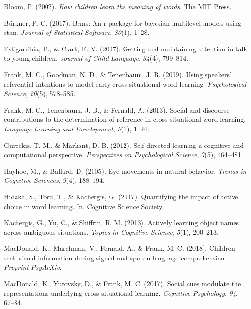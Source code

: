\documentclass[10pt, letterpaper]{article}
\begin{document}
\leavevmode\hypertarget{ref-bloom2002children}{}%
Bloom, P. (2002). \emph{How children learn the meaning of words}. The
MIT Press.

\leavevmode\hypertarget{ref-burkner2017brms}{}%
Bürkner, P.-C. (2017). Brms: An r package for bayesian multilevel models
using stan. \emph{Journal of Statistical Software}, \emph{80}(1), 1--28.

\leavevmode\hypertarget{ref-estigarribia2007getting}{}%
Estigarribia, B., \& Clark, E. V. (2007). Getting and maintaining
attention in talk to young children. \emph{Journal of Child Language},
\emph{34}(4), 799--814.

\leavevmode\hypertarget{ref-frank2009using}{}%
Frank, M. C., Goodman, N. D., \& Tenenbaum, J. B. (2009). Using
speakers' referential intentions to model early cross-situational word
learning. \emph{Psychological Science}, \emph{20}(5), 578--585.

\leavevmode\hypertarget{ref-frank2013social}{}%
Frank, M. C., Tenenbaum, J. B., \& Fernald, A. (2013). Social and
discourse contributions to the determination of reference in
cross-situational word learning. \emph{Language Learning and
Development}, \emph{9}(1), 1--24.

\leavevmode\hypertarget{ref-gureckis2012self}{}%
Gureckis, T. M., \& Markant, D. B. (2012). Self-directed learning a
cognitive and computational perspective. \emph{Perspectives on
Psychological Science}, \emph{7}(5), 464--481.

\leavevmode\hypertarget{ref-hayhoe2005eye}{}%
Hayhoe, M., \& Ballard, D. (2005). Eye movements in natural behavior.
\emph{Trends in Cognitive Sciences}, \emph{9}(4), 188--194.

\leavevmode\hypertarget{ref-hidaka2017quantifying}{}%
Hidaka, S., Torii, T., \& Kachergis, G. (2017). Quantifying the impact
of active choice in word learning. In. Cognitive Science Society.

\leavevmode\hypertarget{ref-kachergis2013actively}{}%
Kachergis, G., Yu, C., \& Shiffrin, R. M. (2013). Actively learning
object names across ambiguous situations. \emph{Topics in Cognitive
Science}, \emph{5}(1), 200--213.

\leavevmode\hypertarget{ref-macdonald2018speed}{}%
MacDonald, K., Marchman, V., Fernald, A., \& Frank, M. C. (2018).
Children seek visual information during signed and spoken language
comprehension. \emph{Preprint PsyArXiv}.

\leavevmode\hypertarget{ref-macdonald2017social}{}%
MacDonald, K., Yurovsky, D., \& Frank, M. C. (2017). Social cues
modulate the representations underlying cross-situational learning.
\emph{Cognitive Psychology}, \emph{94}, 67--84.
\end{document}
